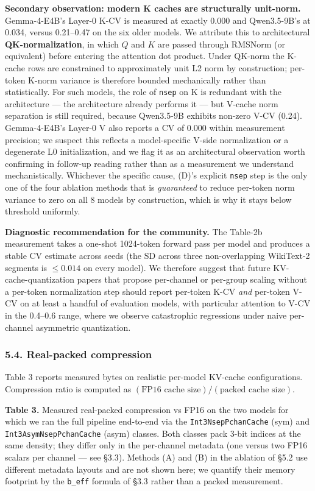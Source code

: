 \documentclass[
]{article}
\begin{document}
\textbf{Secondary observation: modern K caches are structurally
unit-norm.} Gemma-4-E4B's Layer-0 K-CV is measured at exactly 0.000 and
Qwen3.5-9B's at 0.034, versus 0.21--0.47 on the six older models. We
attribute this to architectural \textbf{QK-normalization}, in which
\(Q\) and \(K\) are passed through RMSNorm (or equivalent) before
entering the attention dot product. Under QK-norm the K-cache rows are
constrained to approximately unit L2 norm by construction; per-token
K-norm variance is therefore bounded mechanically rather than
statistically. For such models, the role of \texttt{nsep} on K is
redundant with the architecture --- the architecture already performs it
--- but V-cache norm separation is still required, because Qwen3.5-9B
exhibits non-zero V-CV (0.24). Gemma-4-E4B's Layer-0 V also reports a CV
of 0.000 within measurement precision; we suspect this reflects a
model-specific V-side normalization or a degenerate L0 initialization,
and we flag it as an architectural observation worth confirming in
follow-up reading rather than as a measurement we understand
mechanistically. Whichever the specific cause, (D)'s explicit
\texttt{nsep} step is the only one of the four ablation methods that is
\emph{guaranteed} to reduce per-token norm variance to zero on all 8
models by construction, which is why it stays below threshold uniformly.

\textbf{Diagnostic recommendation for the community.} The Table-2b
measurement takes a one-shot 1024-token forward pass per model and
produces a stable CV estimate across seeds (the SD across three
non-overlapping WikiText-2 segments is \(\leq 0.014\) on every model).
We therefore suggest that future KV-cache-quantization papers that
propose per-channel or per-group scaling without a per-token
normalization step should report per-token K-CV \emph{and} per-token
V-CV on at least a handful of evaluation models, with particular
attention to V-CV in the 0.4--0.6 range, where we observe catastrophic
regressions under naive per-channel asymmetric quantization.

\subsubsection{5.4. Real-packed
compression}\label{real-packed-compression}

Table 3 reports measured bytes on realistic per-model KV-cache
configurations. Compression ratio is computed as
\((\text{FP16 cache size}) / (\text{packed cache size})\).

\textbf{Table 3.} Measured real-packed compression vs FP16 on the two
models for which we ran the full pipeline end-to-end via the
\texttt{Int3NsepPchanCache} (sym) and \texttt{Int3AsymNsepPchanCache}
(asym) classes. Both classes pack 3-bit indices at the same density;
they differ only in the per-channel metadata (one versus two FP16
scalars per channel --- see §3.3). Methods (A) and (B) in the ablation
of §5.2 use different metadata layouts and are not shown here; we
quantify their memory footprint by the \texttt{b\_eff} formula of §3.3
rather than a packed measurement.
\end{document}
